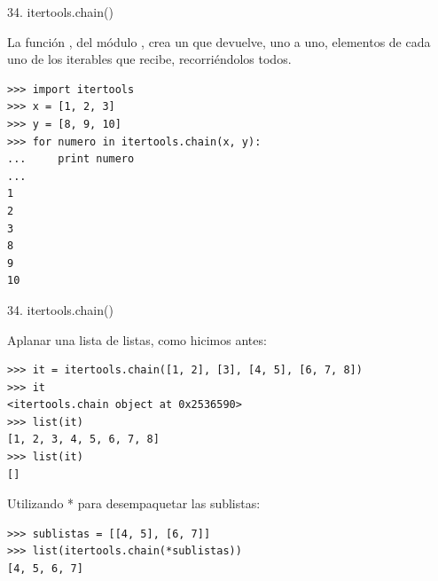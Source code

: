 \documentclass[14pt]{beamer}
\begin{document}
\begin{frame}[fragile]{34. itertools.chain()}
  \small
  \begin{block}{}
    \centering
    La función , del módulo ,
    crea un  que devuelve, uno a uno, elementos de
    cada uno de los iterables que recibe, recorriéndolos todos.
  \end{block}

  \footnotesize
  \begin{exampleblock}{}
    \begin{lstlisting}
>>> import itertools
>>> x = [1, 2, 3]
>>> y = [8, 9, 10]
>>> for numero in itertools.chain(x, y):
...     print numero
...
1
2
3
8
9
10
    \end{lstlisting}
  \end{exampleblock}
\end{frame}

\begin{frame}[fragile]{34. itertools.chain()}
  \scriptsize
  \begin{exampleblock}
    {\footnotesize
      Aplanar una lista de listas, como hicimos antes:}
    \begin{lstlisting}
>>> it = itertools.chain([1, 2], [3], [4, 5], [6, 7, 8])
>>> it
<itertools.chain object at 0x2536590>
>>> list(it)
[1, 2, 3, 4, 5, 6, 7, 8]
>>> list(it)
[]
    \end{lstlisting}
  \end{exampleblock}

  \begin{exampleblock}
  {\footnotesize
    Utilizando * para desempaquetar las sublistas:}
    \begin{lstlisting}
>>> sublistas = [[4, 5], [6, 7]]
>>> list(itertools.chain(*sublistas))
[4, 5, 6, 7]
    \end{lstlisting}
  \end{exampleblock}
\end{frame}
\end{document}
